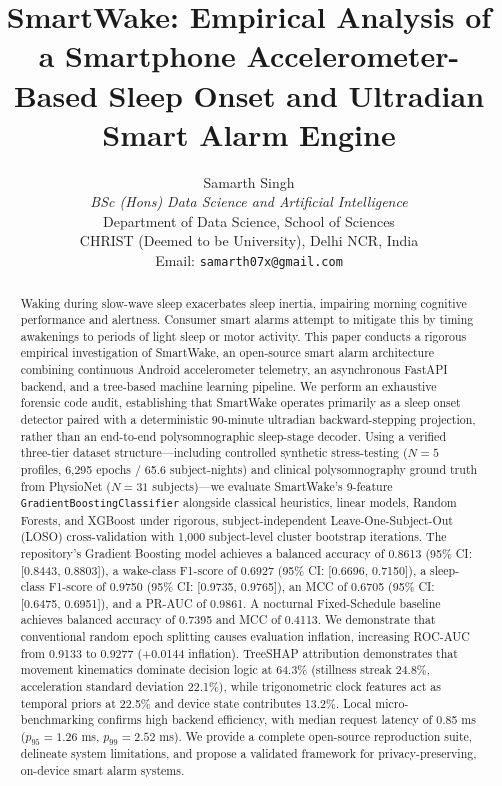 \documentclass[journal,11pt,onecolumn]{IEEEtran}
\begin{document}
\title{SmartWake: Empirical Analysis of a Smartphone Accelerometer-Based Sleep Onset and Ultradian Smart Alarm Engine}

\author{Samarth Singh\\
\textit{BSc (Hons) Data Science and Artificial Intelligence}\\
Department of Data Science, School of Sciences\\
CHRIST (Deemed to be University), Delhi NCR, India\\
Email: \texttt{samarth07x@gmail.com}}

\maketitle

\hypertarget{sec:abstract}{}\begin{abstract}
Waking during slow-wave sleep exacerbates sleep inertia, impairing morning cognitive performance and alertness. Consumer smart alarms attempt to mitigate this by timing awakenings to periods of light sleep or motor activity. This paper conducts a rigorous empirical investigation of SmartWake, an open-source smart alarm architecture combining continuous Android accelerometer telemetry, an asynchronous FastAPI backend, and a tree-based machine learning pipeline. We perform an exhaustive forensic code audit, establishing that SmartWake operates primarily as a sleep onset detector paired with a deterministic 90-minute ultradian backward-stepping projection, rather than an end-to-end polysomnographic sleep-stage decoder. Using a verified three-tier dataset structure---including controlled synthetic stress-testing ($N=5$ profiles, 6,295 epochs / 65.6 subject-nights) and clinical polysomnography ground truth from PhysioNet ($N=31$ subjects)---we evaluate SmartWake's 9-feature \texttt{GradientBoostingClassifier} alongside classical heuristics, linear models, Random Forests, and XGBoost under rigorous, subject-independent Leave-One-Subject-Out (LOSO) cross-validation with 1,000 subject-level cluster bootstrap iterations. The repository's Gradient Boosting model achieves a balanced accuracy of 0.8613 (95\% CI: [0.8443, 0.8803]), a wake-class F1-score of 0.6927 (95\% CI: [0.6696, 0.7150]), a sleep-class F1-score of 0.9750 (95\% CI: [0.9735, 0.9765]), an MCC of 0.6705 (95\% CI: [0.6475, 0.6951]), and a PR-AUC of 0.9861. A nocturnal Fixed-Schedule baseline achieves balanced accuracy of 0.7395 and MCC of 0.4113. We demonstrate that conventional random epoch splitting causes evaluation inflation, increasing ROC-AUC from 0.9133 to 0.9277 (+0.0144 inflation). TreeSHAP attribution demonstrates that movement kinematics dominate decision logic at 64.3\% (stillness streak 24.8\%, acceleration standard deviation 22.1\%), while trigonometric clock features act as temporal priors at 22.5\% and device state contributes 13.2\%. Local micro-benchmarking confirms high backend efficiency, with median request latency of 0.85 ms ($p_{95}=1.26$ ms, $p_{99}=2.52$ ms). We provide a complete open-source reproduction suite, delineate system limitations, and propose a validated framework for privacy-preserving, on-device smart alarm systems.
\end{abstract}
\end{document}
